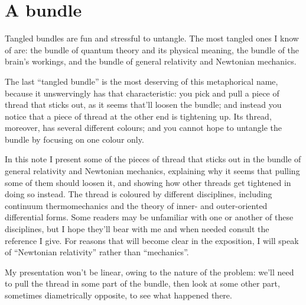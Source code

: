 \documentclass[\ifafour a4paper,12pt,\else a5paper,10pt,\fi%
onecolumn,oneside,article,%
british%
]{memoir}
\theoremstyle{remark}
\theoremstyle{innote}
\renewcommand*{\|}{\nonscript\,\vert\nonscript\;\mathopen{}}
\begin{document}

\section{A bundle}
\label{sec:soup}

Tangled bundles are fun and stressful to untangle. The most tangled
ones I know of are: the bundle of quantum theory and its physical meaning,
the bundle of the brain's workings, and the bundle of general relativity
and Newtonian mechanics.

The last \enquote{tangled bundle} is the most deserving of this
metaphorical name, because it unswervingly has that characteristic: you
pick and pull a piece of thread that sticks out, as it seems that'll loosen
the bundle; and instead you notice that a piece of thread at the other end
is tightening up. Its thread, moreover, has several different colours; and
you cannot hope to untangle the bundle by focusing on one colour only.

In this note I present some of the pieces of thread that sticks out in the
bundle of general relativity and Newtonian mechanics, explaining why it
seems that pulling some of them should loosen it, and showing how other
threads get tightened in doing so instead. The thread is coloured by
different disciplines, including continuum thermomechanics and the theory
of inner- and outer-oriented differential forms. Some readers may be
unfamiliar with one or another of these disciplines, but I hope they'll
bear with me and when needed consult the reference I give. For reasons that
will become clear in the exposition, I will speak of \enquote{Newtonian
  relativity} rather than \enquote{mechanics}.

My presentation won't be linear, owing to the nature of the problem: we'll
need to pull the thread in some part of the bundle, then look at some other
part, sometimes diametrically opposite, to see what happened there.
\end{document}
